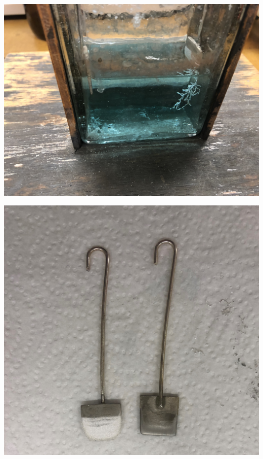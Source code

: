 \documentclass[11pt,ngerman]{scrartcl}
\begin{document}
\begin{minipage}{\textwidth}
	\begin{minipage}[t]{0.5\textwidth}
		\centering
		\includegraphics[width=\textwidth]{dendrit}
		\label{fig:dendrit}
	\end{minipage}
	\vspace{2mm}
	\begin{minipage}[t]{0.50\textwidth}
		\centering
		\includegraphics[width=\textwidth]{elektroden_neu}
		\label{fig:elektroden}
	\end{minipage}
	\vspace{1em}
\end{minipage}
\end{document}
